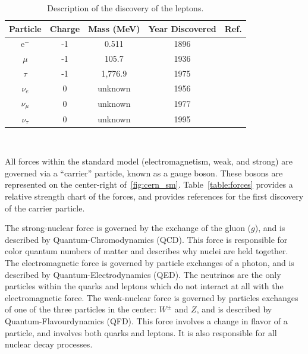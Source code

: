 \begin{table}
\begin{center}
\begin{tabular}{||c c c c c||}
 \hline
 Particle & Charge & Mass (MeV) & Year Discovered & Ref.\\ [0.5ex]
 \hline\hline
 e$^{-}$ & -1 & 0.511 & 1896 & \citep{doi:10.1080/14786449708621070} \\
 \hline
 $\mu$ & -1 & 105.7 & 1936 & \citep{muon_discovery_PhysRev.51.884} \\
 \hline
 $\tau$ & -1 & 1,776.9 & 1975 & \citep{tau_discovery_PhysRevLett.35.1489} \\
 \hline
 $\nu_{e}$ & 0 & unknown & 1956 & \citep{first_neutrino_measurement} \\
 \hline
 $\nu_{\mu}$ & 0 & unknown & 1977 & \citep{PhysRevLett.9.36} \\
 \hline
 $\nu_{\tau}$ & 0 & unknown & 1995 & \citep{tau_neutrino_discovery_KODAMA2001218} \\
 \hline
\end{tabular}
\caption{Description of the discovery of the leptons.
}
\end{center}
\end{table}
~\label{table:lepton}

All forces within the standard model (electromagnetism, weak, and strong) are governed via a ``carrier'' particle, known as a gauge boson.
These bosons are represented on the center-right of~\ref{fig:cern_sm}.
Table~\ref{table:forces} provides a relative strength chart of the forces, and provides references for the first discovery of the carrier particle.

The strong-nuclear force is governed by the exchange of the gluon ($g$), and is described by Quantum-Chromodynamics (QCD).
This force is responsible for color quantum numbers of matter and describes why nuclei are held together.
The electromagnetic force is governed by particle exchanges of a photon, and is described by Quantum-Electrodynamics (QED).
The neutrinos are the only particles within the quarks and leptons which do not interact at all with the electromagnetic force.
The weak-nuclear force is governed by particles exchanges of one of the three particles in the center: $W^{\pm}$ and $Z$, and is described by Quantum-Flavourdynamics (QFD).
This force involves a change in flavor of a particle, and involves both quarks and leptons.
It is also responsible for all nuclear decay processes.

